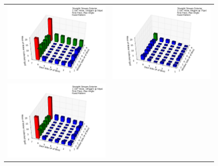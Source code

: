 \documentclass{article}
\begin{document}
\clearpage


\begin{figure}[ht]
\begin{tabular*}{\textwidth}{lr}
\includegraphics[width=3.2in]{../ADD_Analysis/Figures/15-12-08_160630_Datafile_Straight_Stream_Exterior.png} &
\includegraphics[width=3.2in]{../ADD_Analysis/Figures/15-12-08_161540_Datafile_Straight_Stream_Exterior.png} \\
\includegraphics[width=3.2in]{../ADD_Analysis/Figures/15-12-08_162126_Datafile_Straight_Stream_Exterior.png} &

\end{tabular*}
\end{figure}
\end{document}
